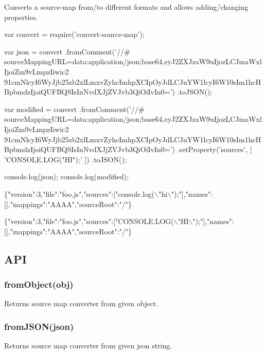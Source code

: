 \href{https://nodei.co/npm/convert-source-map/}{\tt }

Converts a source-\/map from/to different formats and allows adding/changing properties.


\begin{DoxyCode}
var convert = require('convert-source-map');

var json = convert
  .fromComment('//#
       sourceMappingURL=data:application/json;base64,eyJ2ZXJzaW9uIjozLCJmaWxlIjoiZm9vLmpzIiwic2
      91cmNlcyI6WyJjb25zb2xlLmxvZyhcImhpXCIpOyJdLCJuYW1lcyI6W10sIm1hcHBpbmdzIjoiQUFBQSIsInNvdXJjZVJvb3QiOiIvIn0=')
  .toJSON();

var modified = convert
  .fromComment('//#
       sourceMappingURL=data:application/json;base64,eyJ2ZXJzaW9uIjozLCJmaWxlIjoiZm9vLmpzIiwic2
      91cmNlcyI6WyJjb25zb2xlLmxvZyhcImhpXCIpOyJdLCJuYW1lcyI6W10sIm1hcHBpbmdzIjoiQUFBQSIsInNvdXJjZVJvb3QiOiIvIn0=')
  .setProperty('sources', [ 'CONSOLE.LOG("HI");' ])
  .toJSON();

console.log(json);
console.log(modified);
\end{DoxyCode}



\begin{DoxyCode}

      \{"version":3,"file":"foo.js","sources":["console.log(\(\backslash\)"hi\(\backslash\)");"],"names":[],"mappings":"AAAA","sourceRoot":"/"\}

      \{"version":3,"file":"foo.js","sources":["CONSOLE.LOG(\(\backslash\)"HI\(\backslash\)");"],"names":[],"mappings":"AAAA","sourceRoot":"/"\}
\end{DoxyCode}


\subsection*{A\+PI}

\subsubsection*{from\+Object(obj)}

Returns source map converter from given object.

\subsubsection*{from\+J\+S\+O\+N(json)}

Returns source map converter from given json string.

